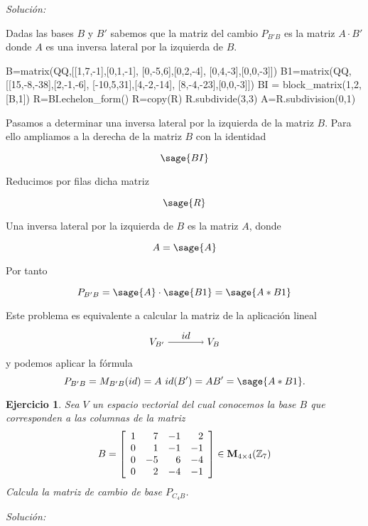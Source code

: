 \documentclass{amsart}
\newtheorem{ejer}{Ejercicio}
\def\z{\mathbb{Z}}
\begin{document}
{\it Soluci\'on:}

Dadas las bases $B$ y $B'$ sabemos que la matriz del cambio $P_{B'B}$ es la 
matriz $A\cdot B'$ donde $A$ es una inversa lateral por la izquierda de $B$.

\begin{sageblock}
B=matrix(QQ,[[1,7,-1],[0,1,-1],
[0,-5,6],[0,2,-4],
[0,4,-3],[0,0,-3]])
B1=matrix(QQ,[[15,-8,-38],[2,-1,-6],
[-10,5,31],[4,-2,-14],
[8,-4,-23],[0,0,-3]])
BI = block_matrix(1,2,[B,1])
R=BI.echelon_form()
R=copy(R)
R.subdivide(3,3)
A=R.subdivision(0,1)
\end{sageblock}

Pasamos a determinar una inversa lateral por la izquierda de la matriz $B$. Para 
ello ampliamos a la derecha de la matriz $B$ con la identidad

$$ \sage{BI} $$

Reducimos por filas dicha matriz 

$$ \sage{R} $$

Una inversa lateral por la izquierda de $B$ es la matriz $A$, donde

$$ A = \sage{A} $$

Por tanto

$$ P_{B'B} = \sage{A}\cdot \sage{B1} = \sage{A*B1} $$

Este problema es equivalente a calcular la matriz de la aplicación lineal 
$$
\begin{tikzpicture}
\node (VBp) at (0,0) {$V_{B'}$};
\node (VB) at (2,0) {$V_B$};
\draw[->] (VBp) to node [above] {$id$} (VB);
\end{tikzpicture}
$$
y podemos aplicar la fórmula 
$$P_{B'B} = M_{B'B}(id) = A ~ id(B') = AB' = \sage{A*B1}.$$


\begin{ejer} Sea $V$ un espacio vectorial del cual conocemos la base $B$  
que corres\-ponden a las columnas de la matriz
\[ B = \left[\begin{array}{rrrr}
1 & 7 & -1 & 2 \\
0 & 1 & -1 & -1 \\
0 & -5 & 6 & -4 \\
0 & 2 & -4 & -1
\end{array}\right] \in {\bf  M}_{4 \times 4}({\z _7})\]
Calcula la matriz de cambio de base $P_{C_4B}$.
\end{ejer}

{\it Soluci\'on:}
\end{document}
